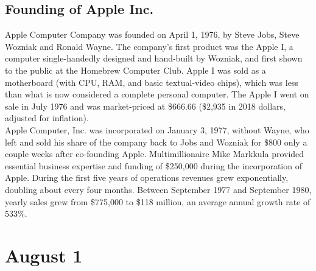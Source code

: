 \documentclass[11pt]{report}
\begin{document}
\subsection{Founding of Apple Inc.}
Apple Computer Company was founded on April 1, 1976, by Steve Jobs, Steve Wozniak and Ronald Wayne. The company's first product was the Apple I, a computer single-handedly designed and hand-built by Wozniak, and first shown to the public at the Homebrew Computer Club. Apple I was sold as a motherboard (with CPU, RAM, and basic textual-video chips), which was less than what is now considered a complete personal computer. The Apple I went on sale in July 1976 and was market-priced at \$666.66 (\$2,935 in 2018 dollars, adjusted for inflation).\\
\indent Apple Computer, Inc. was incorporated on January 3, 1977, without Wayne, who left and sold his share of the company back to Jobs and Wozniak for \$800 only a couple weeks after co-founding Apple. Multimillionaire Mike Markkula provided essential business expertise and funding of \$250,000 during the incorporation of Apple. During the first five years of operations revenues grew exponentially, doubling about every four months. Between September 1977 and September 1980, yearly sales grew from \$775,000 to \$118 million, an average annual growth rate of 533\%.
\section{August 1}
\end{document}
